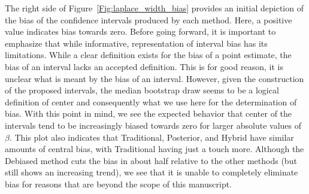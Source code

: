 The right side of Figure~\ref{Fig:laplace_width_bias} provides an initial depiction of the bias of the confidence intervals produced by each method. Here, a positive value indicates bias towards zero. Before going forward, it is important to emphasize that while informative, representation of interval bias has its limitations. While a clear definition exists for the bias of a point estimate, the bias of an interval lacks an accepted definition. This is for good reason, it is unclear what is meant by the bias of an interval. However, given the construction of the proposed intervals, the median bootstrap draw seems to be a logical definition of center and consequently what we use here for the determination of bias. With this point in mind, we see the expected behavior that center of the intervals tend to be increasingly biased towards zero for larger absolute values of $\beta$. This plot also indicates that Traditional, Posterior, and Hybrid have similar amounts of central bias, with Traditional having just a touch more. Although the Debiased method cuts the bias in about half relative to the other methods (but still shows an increasing trend), we see that it is unable to completely eliminate bias for reasons that are beyond the scope of this manuscript.

